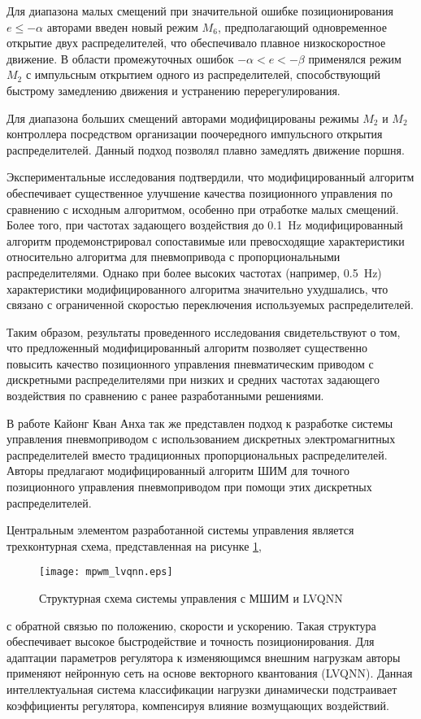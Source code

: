 Для диапазона малых смещений при значительной ошибке позиционирования
$e \leqslant -\alpha$ авторами
введен новый режим $M_6$, предполагающий одновременное открытие двух распределителей, что обеспечивало
плавное низкоскоростное движение. В области промежуточных ошибок
$-\alpha < e < -\beta$ применялся режим
$M_2$ с импульсным открытием одного из распределителей, способствующий быстрому замедлению движения и
устранению перерегулирования.

Для диапазона больших смещений авторами модифицированы режимы $M_2$ и $M_2$ контроллера
посредством организации поочередного импульсного открытия распределителей. Данный подход позволял
плавно замедлять движение поршня.

Экспериментальные исследования подтвердили, что модифицированный алгоритм обеспечивает
существенное улучшение качества позиционного управления по сравнению с исходным алгоритмом,
особенно при отработке малых смещений. Более того, при частотах задающего воздействия
до \num{0.1}~\si{\hertz} модифицированный алгоритм продемонстрировал сопоставимые или превосходящие
характеристики относительно алгоритма для пневмопривода с пропорциональными
распределителями. Однако при более высоких частотах (например, \num{0.5}~\si{\hertz}) характеристики модифицированного
алгоритма значительно ухудшались, что связано с ограниченной скоростью переключения
используемых распределителей.

Таким образом, результаты проведенного исследования свидетельствуют о том, что предложенный
модифицированный алгоритм позволяет существенно повысить качество позиционного управления
пневматическим приводом с дискретными распределителями при низких и средних частотах задающего
воздействия по сравнению с ранее разработанными решениями.

В работе Кайонг Кван Анха \cite*{AHN2005683} так же представлен подход к разработке системы управления пневмоприводом
с использованием дискретных электромагнитных распределителей вместо традиционных пропорциональных распределителей.
Авторы предлагают модифицированный алгоритм ШИМ для точного позиционного управления
пневмоприводом при помощи этих дискретных распределителей.

Центральным элементом разработанной системы управления является трехконтурная схема, представленная на рисунке
\cref*{fig:mpwm_lvqnn},
\begin{figure}[htpb]
    \centerfloat
    \texttt{[image: mpwm\_lvqnn.eps]}
    \caption{Структурная схема системы управления с МШИМ и LVQNN}\label{fig:mpwm_lvqnn}
\end{figure}
с обратной связью по положению, скорости и ускорению. Такая структура обеспечивает высокое быстродействие и
точность позиционирования. Для адаптации параметров регулятора к изменяющимся внешним нагрузкам авторы применяют
нейронную сеть на основе векторного квантования (LVQNN). Данная интеллектуальная система классификации нагрузки
динамически подстраивает коэффициенты регулятора, компенсируя влияние возмущающих воздействий.

